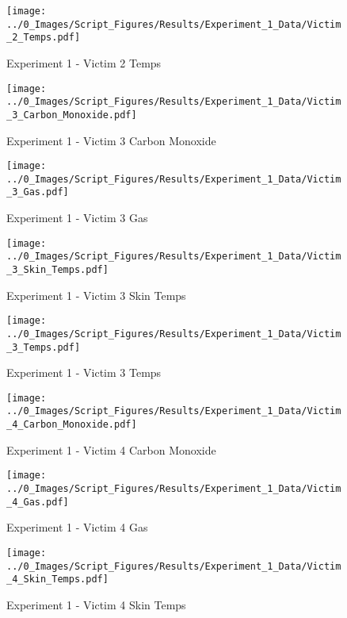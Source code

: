 	\begin{figure}[H]
		\centering
		\texttt{[image: ../0\_Images/Script\_Figures/Results/Experiment\_1\_Data/Victim\_2\_Temps.pdf]}
		\caption[]{Experiment 1 - Victim 2 Temps}
	\end{figure}
 
	\clearpage

	\begin{figure}[H]
		\centering
		\texttt{[image: ../0\_Images/Script\_Figures/Results/Experiment\_1\_Data/Victim\_3\_Carbon\_Monoxide.pdf]}
		\caption[]{Experiment 1 - Victim 3 Carbon Monoxide}
	\end{figure}
 

	\begin{figure}[H]
		\centering
		\texttt{[image: ../0\_Images/Script\_Figures/Results/Experiment\_1\_Data/Victim\_3\_Gas.pdf]}
		\caption[]{Experiment 1 - Victim 3 Gas}
	\end{figure}
 
	\clearpage

	\begin{figure}[H]
		\centering
		\texttt{[image: ../0\_Images/Script\_Figures/Results/Experiment\_1\_Data/Victim\_3\_Skin\_Temps.pdf]}
		\caption[]{Experiment 1 - Victim 3 Skin Temps}
	\end{figure}
 

	\begin{figure}[H]
		\centering
		\texttt{[image: ../0\_Images/Script\_Figures/Results/Experiment\_1\_Data/Victim\_3\_Temps.pdf]}
		\caption[]{Experiment 1 - Victim 3 Temps}
	\end{figure}
 
	\clearpage

	\begin{figure}[H]
		\centering
		\texttt{[image: ../0\_Images/Script\_Figures/Results/Experiment\_1\_Data/Victim\_4\_Carbon\_Monoxide.pdf]}
		\caption[]{Experiment 1 - Victim 4 Carbon Monoxide}
	\end{figure}
 

	\begin{figure}[H]
		\centering
		\texttt{[image: ../0\_Images/Script\_Figures/Results/Experiment\_1\_Data/Victim\_4\_Gas.pdf]}
		\caption[]{Experiment 1 - Victim 4 Gas}
	\end{figure}
 
	\clearpage

	\begin{figure}[H]
		\centering
		\texttt{[image: ../0\_Images/Script\_Figures/Results/Experiment\_1\_Data/Victim\_4\_Skin\_Temps.pdf]}
		\caption[]{Experiment 1 - Victim 4 Skin Temps}
	\end{figure}
 

